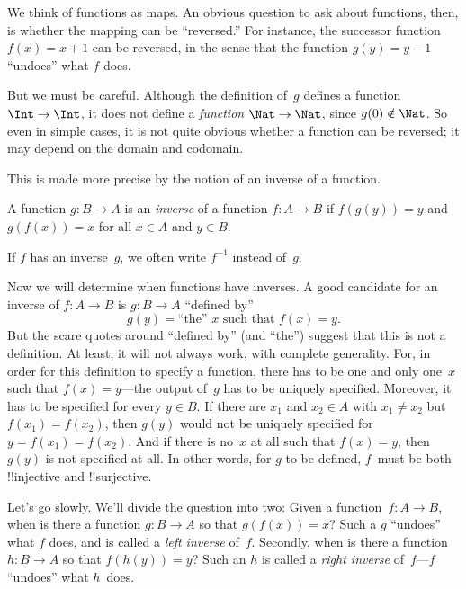 \documentclass[../../../include/open-logic-section]{subfiles}
\begin{document}

\begin{explain}
We think of functions as maps. An obvious question to ask about
functions, then, is whether the mapping can be ``reversed.'' For
instance, the successor function $f(x) = x + 1$ can be reversed, in
the sense that the function $g(y) = y - 1$ ``undoes'' what $f$ does. 

But we must be careful. Although the definition of~$g$ defines a
function $\Int \to \Int$, it does not define a \emph{function} $\Nat
\to \Nat$, since $g(0) \notin \Nat$.  So even in simple cases, it is
not quite obvious whether a function can be reversed; it may depend on
the domain and codomain.

This is made more precise by the notion of an inverse of a function.
\end{explain}

\begin{defn}
A function $g \colon B \to A$ is an \emph{inverse} of a function $f
\colon A \to B$ if $f(g(y)) = y$ and $g(f(x)) = x$ for all $x \in A$
and $y \in B$.
\end{defn}

If $f$ has an inverse~$g$, we often write $f^{-1}$ instead of~$g$.

\begin{explain}
Now we will determine when functions have inverses. A good candidate
for an inverse of $f\colon A \to B$ is $g\colon B \to A$ ``defined
by''
\[
g(y) = \text{``the'' $x$ such that $f(x) = y$.}
\]
But the scare quotes around ``defined by'' (and ``the'') suggest that
this is not a definition.  At least, it will not always work, with
complete generality. For, in order for this definition to specify a
function, there has to be one and only one~$x$ such that $f(x) =
y$---the output of~$g$ has to be uniquely specified. Moreover, it has
to be specified for every $y \in B$.  If there are $x_1$ and $x_2 \in
A$ with $x_1 \neq x_2$ but $f(x_1) = f(x_2)$, then $g(y)$ would not be
uniquely specified for $y = f(x_1) = f(x_2)$. And if there is no~$x$
at all such that $f(x) = y$, then $g(y)$ is not specified at all.  In
other words, for $g$ to be defined, $f$~must be both !!{injective} and
!!{surjective}.

Let's go slowly. We'll divide the question into two: Given a
function~$f\colon A \to B$, when is there a function $g\colon B \to A$
so that $g(f(x)) = x$? Such a $g$ ``undoes'' what $f$ does, and is
called a \emph{left inverse} of~$f$. Secondly, when is there a
function $h\colon B \to A$ so that $f(h(y)) = y$? Such an $h$ is
called a \emph{right inverse} of~$f$---$f$ ``undoes'' what $h$~does.
\end{explain}
\end{document}
